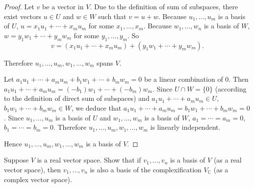 \begin{proof}
    Let $v$ be a vector in $V$. Due to the definition of sum of subspaces, there exist vectors $u\in U$ and $w\in W$ such that $v = u + w$. Because $u_{1}, \ldots, u_{m}$ is a basis of $U$, $u = x_{1}u_{1} + \cdots + x_{m}u_{m}$ for some $x_{1}, \ldots, x_{m}$. Because $w_{1}, \ldots, w_{n}$ is a basis of $W$, $w = y_{1}w_{1} + \cdots + y_{m}w_{m}$ for some $y_{1}, \ldots, y_{m}$. So
    \[
        v = (x_{1}u_{1} + \cdots + x_{m}u_{m}) + (y_{1}w_{1} + \cdots + y_{m}w_{m}).
    \]

    Therefore $u_{1}, \ldots, u_{m}, w_{1}, \ldots, w_{m}$ spans $V$.

    Let $a_{1}u_{1} + \cdots + a_{m}u_{m} + b_{1}w_{1} + \cdots + b_{m}w_{m} = 0$ be a linear combination of $0$. Then $a_{1}u_{1} + \cdots + a_{m}u_{m} = (-b_{1})w_{1} + \cdots + (-b_{m})w_{m}$. Since $U\cap W = \{0\}$ (according to the definition of direct sum of subspaces) and $a_{1}u_{1} + \cdots + a_{m}u_{m}\in U$, $b_{1}w_{1} + \cdots + b_{m}w_{m}\in W$, we deduce that $a_{1}u_{1} + \cdots + a_{m}u_{m} = b_{1}w_{1} + \cdots + b_{m}w_{m} = 0$. Since $u_{1}, \ldots, u_{m}$ is a basis of $U$ and $w_{1}, \ldots, w_{m}$ is a basis of $W$, $a_{1} = \cdots = a_{m} = 0$, $b_{1} = \cdots = b_{m} = 0$. Therefore $u_{1}, \ldots, u_{m}, w_{1}, \ldots, w_{m}$ is linearly independent.

    Hence $u_{1}, \ldots, u_{m}, w_{1}, \ldots, w_{m}$ is a basis of $V$.
\end{proof}

\begin{exercise}
    Suppose $V$ is a real vector space. Show that if $v_{1}, \ldots, v_{n}$ is a basis of $V$ (as a real vector space), then $v_{1}, \ldots, v_{n}$ is also a basis of the complexification $V_{\mathbb{C}}$ (as a complex vector space).
\end{exercise}

